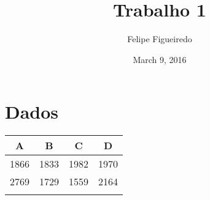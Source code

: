 \documentclass[]{article}
\title{Trabalho 1}
\author{Felipe Figueiredo}
\date{March 9, 2016}
\begin{document}
\maketitle


\section{Dados}\label{dados}

\begin{longtable}[c]{@{}cccc@{}}
\toprule
\begin{minipage}[b]{0.06\columnwidth}\centering\strut
A
\strut\end{minipage} &
\begin{minipage}[b]{0.06\columnwidth}\centering\strut
B
\strut\end{minipage} &
\begin{minipage}[b]{0.06\columnwidth}\centering\strut
C
\strut\end{minipage} &
\begin{minipage}[b]{0.06\columnwidth}\centering\strut
D
\strut\end{minipage}\tabularnewline
\midrule
\endhead
\begin{minipage}[t]{0.06\columnwidth}\centering\strut
1866
\strut\end{minipage} &
\begin{minipage}[t]{0.06\columnwidth}\centering\strut
1833
\strut\end{minipage} &
\begin{minipage}[t]{0.06\columnwidth}\centering\strut
1982
\strut\end{minipage} &
\begin{minipage}[t]{0.06\columnwidth}\centering\strut
1970
\strut\end{minipage}\tabularnewline
\begin{minipage}[t]{0.06\columnwidth}\centering\strut
2769
\strut\end{minipage} &
\begin{minipage}[t]{0.06\columnwidth}\centering\strut
1729
\strut\end{minipage} &
\begin{minipage}[t]{0.06\columnwidth}\centering\strut
1559
\strut\end{minipage} &
\begin{minipage}[t]{0.06\columnwidth}\centering\strut
2164
\strut\end{minipage}\tabularnewline
\begin{minipage}[t]{0.06\columnwidth}\centering\strut

\end{minipage}
\end{longtable}
\end{document}
